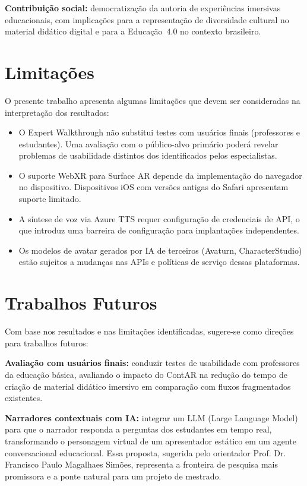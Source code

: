 \documentclass[
  12pt,
  openright,
  twoside,
  a4paper,
  english,
  brazil
]{abntex2}
\begin{document}
\textbf{Contribuição social:} democratização da autoria de experiências
imersivas educacionais, com implicações para a representação de diversidade
cultural no material didático digital e para a Educação~4.0 no contexto
brasileiro.

\section{Limitações}
\label{sec:limitacoes}

O presente trabalho apresenta algumas limitações que devem ser consideradas
na interpretação dos resultados:

\begin{itemize}
  \item O Expert Walkthrough não substitui testes com usuários finais
        (professores e estudantes). Uma avaliação com o público-alvo primário
        poderá revelar problemas de usabilidade distintos dos identificados
        pelos especialistas.
  \item O suporte WebXR para Surface AR depende da implementação do
        navegador no dispositivo. Dispositivos iOS com versões antigas
        do Safari apresentam suporte limitado.
  \item A síntese de voz via Azure TTS requer configuração de credenciais
        de API, o que introduz uma barreira de configuração para implantações
        independentes.
  \item Os modelos de avatar gerados por IA de terceiros (Avaturn,
        CharacterStudio) estão sujeitos a mudanças nas APIs e políticas
        de serviço dessas plataformas.
\end{itemize}

\section{Trabalhos Futuros}
\label{sec:trabalhos-futuros}

Com base nos resultados e nas limitações identificadas, sugere-se como
direções para trabalhos futuros:

\textbf{Avaliação com usuários finais:} conduzir testes de usabilidade
com professores da educação básica, avaliando o impacto do ContAR na
redução do tempo de criação de material didático imersivo em comparação
com fluxos fragmentados existentes.

\textbf{Narradores contextuais com IA:} integrar um LLM (Large Language
Model) para que o narrador responda a perguntas dos estudantes em tempo
real, transformando o personagem virtual de um apresentador estático em
um agente conversacional educacional. Essa proposta, sugerida pelo
orientador Prof. Dr. Francisco Paulo Magalhaes Simões, representa a fronteira de pesquisa mais
promissora e a ponte natural para um projeto de mestrado.
\end{document}
